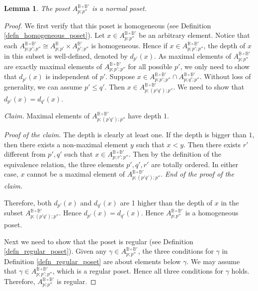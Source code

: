 \documentclass[reqno, 10pt]{amsart}
\numberwithin{equation}{section}
\numberwithin{equation}{section}
\newtheorem{lemma}[thm]{Lemma}
\theoremstyle{definition}
\theoremstyle{remark}
\newcommand{\mb}{\mathbb}
\begin{document}
\begin{lemma}
The poset $A_{p; p''}^{{\mb B}\circ {\mb B}'}$ is a normal poset.     
\end{lemma}

\begin{proof}
We first verify that this poset is homogeneous (see Definition \ref{defn_homogeneous_poset}). Let $x \in A_{p; p''}^{{\mb B} \circ {\mb B}'}$ be an arbitrary element. Notice that each $A_{p; p'; p''}^{{\mb B} \circ {\mb B}'} \cong A_{p; p'}^{{\mb B}}\times A_{p'; p''}^{{\mb B}'}$ is homogeneous. Hence if $x \in A_{p; p'; p''}^{{\mb B}\circ {\mb B}'}$, the depth of $x$ in this subset is well-defined, denoted by $d_{p'}(x)$. As maximal elements of $A_{p; p''}^{{\mb B} \circ {\mb B}'}$ are exactly maximal elements of $A_{p; p'; p''}^{{\mb B} \circ {\mb B}'}$ for all possible $p'$, we only need to show that $d_{p'}(x)$ is independent of $p'$. Suppose $x \in A_{p; p'; p''}^{{\mb B} \circ {\mb B}'} \cap A_{p; q'; p''}^{{\mb B} \circ {\mb B}'}$. Without loss of generality, we can assume $p' \leq q'$. Then $x \in A_{p; (p'q'); p''}^{{\mb B} \circ {\mb B}'}$. We need to show that $d_{p'}(x) = d_{q'}(x)$. 

{\it Claim.} Maximal elements of $A_{p; (p'q'); p''}^{{\mb B} \circ {\mb B}'}$ have depth $1$.

{\it Proof of the claim.} The depth is clearly at least one. If the depth is bigger than $1$, then there exists a non-maximal element $y$ such that $x< y$. Then there exists $r'$ different from $p', q'$ such that $x \in A_{p; r'; p''}^{{\mb B} \circ {\mb B}'}$. Then by the definition of the equivalence relation, the three elements $p', q', r'$ are totally ordered. In either case, $x$ cannot be a maximal element of $A_{p; (p'q'); p''}^{{\mb B} \circ {\mb B}'}$. \hfill {\it End of the proof of the claim.} 


Therefore, both $d_{p'}(x)$ and $d_{q'}(x)$ are 1 higher than the depth of $x$ in the subset $A_{p; (p'q'); p''}^{{\mb B} \circ {\mb B}'}$. Hence $d_{p'}(x) = d_{q'}(x)$. Hence $A_{p; p''}^{{\mb B} \circ {\mb B}'}$ is a homogeneous poset.

Next we need to show that the poset is regular (see Definition \ref{defn_regular_poset}). Given any $\gamma \in A_{p; p''}^{{\mb B}\circ {\mb B}'}$, the three conditions for $\gamma$ in Definition \ref{defn_regular_poset} are about elements below $\gamma$. We may assume that $\gamma \in A_{p; p'; p''}^{{\mb B} \circ {\mb B}'}$, which is a regular poset. Hence all three conditions for $\gamma$ holds. Therefore, $A_{p; p''}^{{\mb B} \circ {\mb B}'}$ is regular.



\end{proof}
\end{document}
